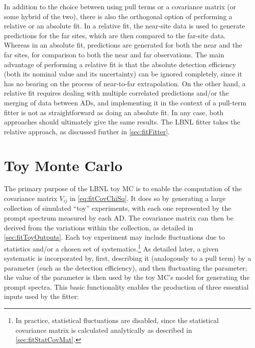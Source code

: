 \documentclass[../thesis.tex]{subfiles}
\begin{document}
In addition to the choice between using pull terms or a covariance matrix (or some hybrid of the two), there is also the orthogonal option of performing a relative or an absolute fit. In a relative fit, the near-site data is used to generate predictions for the far sites, which are then compared to the far-site data. Whereas in an absolute fit, predictions are generated for both the near and the far sites, for comparison to both the near and far observations. The main advantage of performing a relative fit is that the absolute detection efficiency (both its nominal value and its uncertainty) can be ignored completely, since it has no bearing on the process of near-to-far extrapolation. On the other hand, a relative fit requires dealing with multiple correlated predictions and/or the merging of data between ADs, and implementing it in the context of a pull-term fitter is not as straightforward as doing an absolute fit. In any case, both approaches should ultimately give the same results. The LBNL fitter takes the relative approach, as discussed further in \autoref{sec:fitFitter}.

\section{Toy Monte Carlo}
\label{sec:toymc}

The primary purpose of the LBNL toy MC \cite{berkeley_toymc} is to enable the computation of the covariance matrix $V_{ij}$ in \autoref{eq:fitCovChiSq}. It does so by generating a large collection of simulated ``toy'' experiments, with each one represented by the prompt spectrum measured by each AD. The covariance matrix can then be derived from the variations within the collection, as detailed in \autoref{sec:fitToyOutputs}. Each toy experiment may include fluctuations due to statistics and/or a chosen set of systematics.\footnote{In practice, statistical fluctuations are disabled, since the statistical covariance matrix is calculated analytically as described in \autoref{sec:fitStatCovMat}.} As detailed later, a given systematic is incorporated by, first, describing it (analogously to a pull term) by a parameter (such as the detection efficiency), and then fluctuating the parameter; the value of the parameter is then used by the toy MC's model for generating the prompt spectra. This basic functionality enables the production of three essential inputs used by the fitter:
\end{document}
